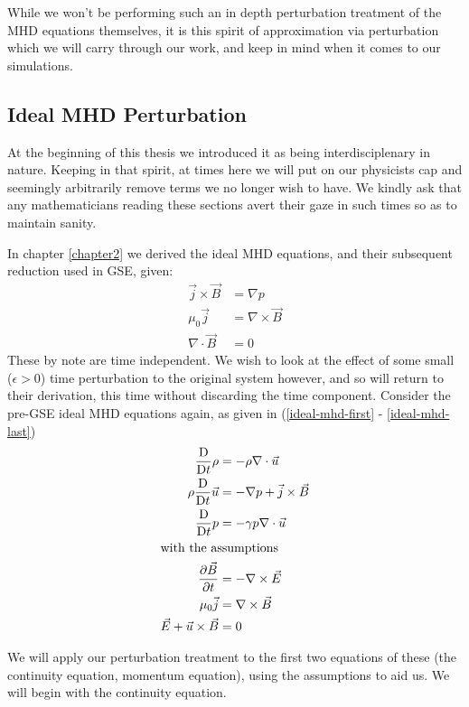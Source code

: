 While we won't be performing such an in depth perturbation treatment of the MHD equations themselves, it is this spirit 
of approximation via perturbation which we will carry through our work, and keep in mind when it comes to our simulations.

\subsection{Ideal MHD Perturbation}

At the beginning of this thesis we introduced it as being interdisciplenary in nature. 
Keeping in that spirit, at times here we will put on our physicists cap and 
seemingly arbitrarily remove terms we no longer wish to have. We 
kindly ask that any mathematicians reading these sections avert their gaze in such 
times so as to maintain sanity.

In chapter \ref{chapter2} we derived the ideal MHD equations, and their subsequent reduction used in GSE, given:
\begin{align}
    \vec{j} \times \vec{B} &= \nabla p \\
    \mu_0 \vec{j} &= \nabla \times \vec{B} \\
    \nabla \cdot \vec{B} &= 0
\end{align}
These by note are time independent. We wish to look at the 
effect of some small ($\epsilon > 0$) time perturbation to the original system however, and so 
will return to their derivation, this time without discarding the time component. Consider the pre-GSE ideal MHD equations again, 
as given in (\eqref{ideal-mhd-first} - \eqref{ideal-mhd-last})
\begin{align*}
    \frac{\text{D}}{\text{D} t} \rho &= -\rho \nabla \cdot \vec{u} \\
    \rho \frac{\text{D}}{\text{D} t} \vec{u} &= -\nabla p + \vec{j} \times \vec{B}\\
    \frac{\text{D}}{\text{D} t} p  &= -\gamma p \nabla \cdot \vec{u} \\
    \shortintertext{with the assumptions}
    \pdv{\vec{B}}{t} &= -\nabla \times \vec{E} \\
    \mu_0 \vec{j} &= \nabla \times \vec{B} \\
    \vec{E} + \vec{u} \times \vec{B} &= 0 
\end{align*}

We will apply our perturbation treatment to the first two equations of these (the continuity equation, momentum equation), 
using the assumptions to aid us. We will begin with the continuity equation.

